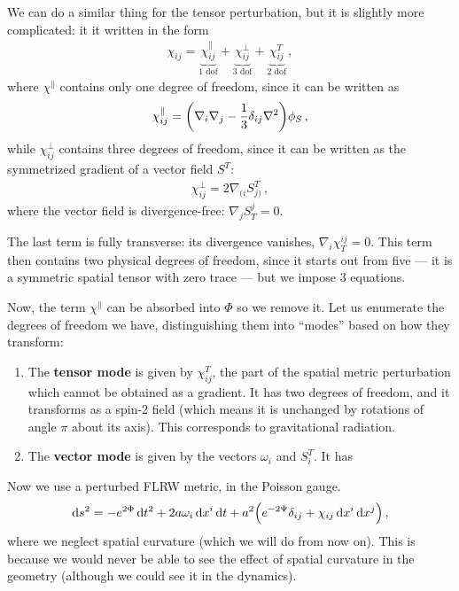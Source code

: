 \documentclass[main.tex]{subfiles}
\begin{document}
\begin{bluebox}
We can do a similar thing for the tensor perturbation, but it is slightly more complicated: it it written in the form 
%
\begin{align}
\chi_{ij} = 
\underbrace{\chi_{ij}^{\parallel}}_{\text{1 dof}} + 
\underbrace{\chi_{ij}^{\perp}}_{\text{3 dof}} + 
\underbrace{\chi_{ij}^{T}}_{\text{2 dof}} 
\,,
\end{align}
%
where \(\chi^{\parallel}\) contains only one degree of freedom, since it can be written as 
%
\begin{align}
\chi^{\parallel}_{ij} = \qty(\nabla_{i} \nabla_{j} - \frac{1}{3} \delta_{ij}\nabla^2) \phi_{S}
\,,
\end{align}
%
while \(\chi^{\perp}_{ij}\) contains three degrees of freedom, since it can be written as the symmetrized gradient of a vector field \(S^{T}\):
%
\begin{align}
\chi^{\perp}_{ij} = 2 \nabla_{(i} S_{j)}^{T}
\,,
\end{align}
%
where the vector field is divergence-free: \(\nabla_{j} S^{j}_{T} = 0\).

The last term is fully transverse: its divergence vanishes, \(\nabla_{i} \chi^{ij}_{T} = 0\).  This term then contains two physical degrees of freedom, since it starts out from five --- it is a symmetric spatial tensor with zero trace --- but we impose 3 equations.

Now, the term \(\chi^{\parallel}\) can be absorbed into \(\Phi \) so we remove it. 
Let us enumerate the degrees of freedom we have, distinguishing them into ``modes'' based on how they transform:
\begin{enumerate}
  \item The \textbf{tensor mode} is given by \(\chi^{T}_{ij}\), the part of the spatial metric perturbation which cannot be obtained as a gradient. It has two degrees of freedom, and it transforms as a spin-2 field (which means it is unchanged by rotations of angle \(\pi \) about its axis). This corresponds to gravitational radiation. 
  \item The \textbf{vector mode} is given by the vectors \(\omega_{i}\) and \(S^{T}_{i}\). It has 
\end{enumerate}

\end{bluebox}
  
  Now we use a perturbed FLRW metric, in the Poisson gauge.  
%
\begin{align}
\dd{s^2} = - e^{2 \Phi } \dd{t^2} 
+ 2 a \omega_{i} \dd{x^{i}} \dd{t} + a^2
\qty(e^{-2 \Psi } \delta_{ij} + \chi_{ij} \dd{x^{i}} \dd{x^{j}})
\,,
\end{align}
%
where we neglect spatial curvature (which we will do from now on). 
This is because we would never be able to see the effect of spatial curvature in the geometry (although we could see it in the dynamics). 
\end{document}
